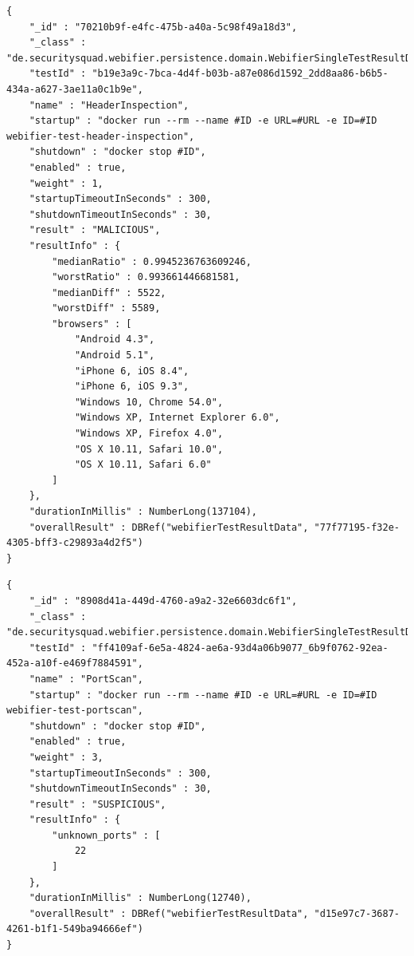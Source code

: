 \begin{scriptsize}
\begin{lstlisting}
{
    "_id" : "70210b9f-e4fc-475b-a40a-5c98f49a18d3",
    "_class" : "de.securitysquad.webifier.persistence.domain.WebifierSingleTestResultData",
    "testId" : "b19e3a9c-7bca-4d4f-b03b-a87e086d1592_2dd8aa86-b6b5-434a-a627-3ae11a0c1b9e",
    "name" : "HeaderInspection",
    "startup" : "docker run --rm --name #ID -e URL=#URL -e ID=#ID webifier-test-header-inspection",
    "shutdown" : "docker stop #ID",
    "enabled" : true,
    "weight" : 1,
    "startupTimeoutInSeconds" : 300,
    "shutdownTimeoutInSeconds" : 30,
    "result" : "MALICIOUS",
    "resultInfo" : {
        "medianRatio" : 0.9945236763609246,
        "worstRatio" : 0.993661446681581,
        "medianDiff" : 5522,
        "worstDiff" : 5589,
        "browsers" : [
            "Android 4.3",
            "Android 5.1",
            "iPhone 6, iOS 8.4",
            "iPhone 6, iOS 9.3",
            "Windows 10, Chrome 54.0",
            "Windows XP, Internet Explorer 6.0",
            "Windows XP, Firefox 4.0",
            "OS X 10.11, Safari 10.0",
            "OS X 10.11, Safari 6.0"
        ]
    },
    "durationInMillis" : NumberLong(137104),
    "overallResult" : DBRef("webifierTestResultData", "77f77195-f32e-4305-bff3-c29893a4d2f5")
}
\end{lstlisting}
\end{scriptsize}

\newpage

\begin{scriptsize}
\begin{lstlisting}
{
    "_id" : "8908d41a-449d-4760-a9a2-32e6603dc6f1",
    "_class" : "de.securitysquad.webifier.persistence.domain.WebifierSingleTestResultData",
    "testId" : "ff4109af-6e5a-4824-ae6a-93d4a06b9077_6b9f0762-92ea-452a-a10f-e469f7884591",
    "name" : "PortScan",
    "startup" : "docker run --rm --name #ID -e URL=#URL -e ID=#ID webifier-test-portscan",
    "shutdown" : "docker stop #ID",
    "enabled" : true,
    "weight" : 3,
    "startupTimeoutInSeconds" : 300,
    "shutdownTimeoutInSeconds" : 30,
    "result" : "SUSPICIOUS",
    "resultInfo" : {
        "unknown_ports" : [
            22
        ]
    },
    "durationInMillis" : NumberLong(12740),
    "overallResult" : DBRef("webifierTestResultData", "d15e97c7-3687-4261-b1f1-549ba94666ef")
}
\end{lstlisting}
\end{scriptsize}

